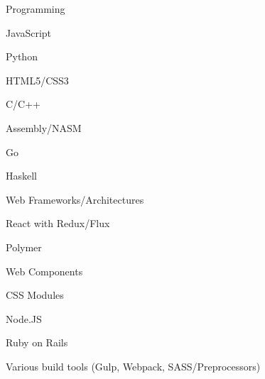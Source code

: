 


\begin{cvskills}


\cvskill
{Programming} %
{\begin{skillsitems}
\item JavaScript
\item Python
\item HTML5/CSS3
\item C/C++
\item Assembly/NASM
\item Go
\item Haskell
\end{skillsitems}
}


\cvskill
{Web Frameworks/Architectures} %
{
\begin{skillsitems}
\item React with Redux/Flux
\item Polymer
\item Web Components
\item CSS Modules
\item Node.JS
\item Ruby on Rails
\item Various build tools (Gulp, Webpack, SASS/Preprocessors)
\end{skillsitems}
} %


\end{cvskills}
